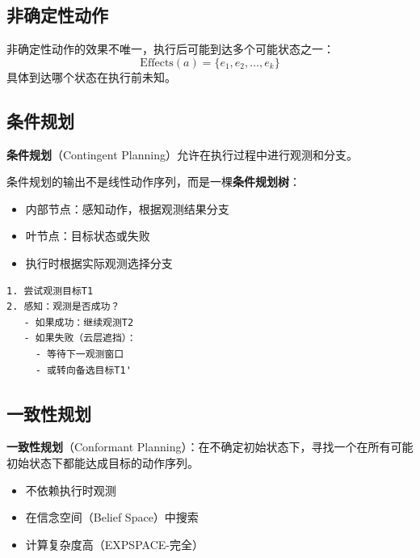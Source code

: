 \subsection{非确定性动作}

\begin{definition}[非确定性动作]
非确定性动作的效果不唯一，执行后可能到达多个可能状态之一：
\[ \text{Effects}(a) = \{e_1, e_2, \ldots, e_k\} \]
具体到达哪个状态在执行前未知。
\end{definition}

\subsection{条件规划}

\textbf{条件规划}（Contingent Planning）允许在执行过程中进行观测和分支。

\begin{keypoint}[条件规划的输出]
条件规划的输出不是线性动作序列，而是一棵\textbf{条件规划树}：
\begin{itemize}
  \item 内部节点：感知动作，根据观测结果分支
  \item 叶节点：目标状态或失败
  \item 执行时根据实际观测选择分支
\end{itemize}
\end{keypoint}

\begin{example}[案例A的条件规划]
\begin{verbatim}
1. 尝试观测目标T1
2. 感知：观测是否成功？
   - 如果成功：继续观测T2
   - 如果失败（云层遮挡）：
     - 等待下一观测窗口
     - 或转向备选目标T1'
\end{verbatim}
\end{example}

\subsection{一致性规划}

\textbf{一致性规划}（Conformant Planning）：在不确定初始状态下，寻找一个在所有可能初始状态下都能达成目标的动作序列。

\begin{itemize}[leftmargin=2em]
  \item 不依赖执行时观测
  \item 在信念空间（Belief Space）中搜索
  \item 计算复杂度高（EXPSPACE-完全）
\end{itemize}

